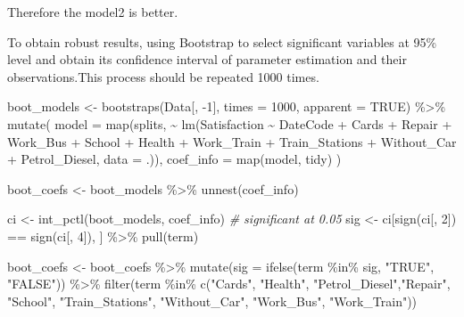 \documentclass[
]{article}
\newenvironment{Shaded}{\begin{snugshade}}{\end{snugshade}}
\newcommand{\AttributeTok}[1]{\textcolor[rgb]{0.77,0.63,0.00}{#1}}
\newcommand{\CommentTok}[1]{\textcolor[rgb]{0.56,0.35,0.01}{\textit{#1}}}
\newcommand{\ConstantTok}[1]{\textcolor[rgb]{0.00,0.00,0.00}{#1}}
\newcommand{\DecValTok}[1]{\textcolor[rgb]{0.00,0.00,0.81}{#1}}
\newcommand{\FunctionTok}[1]{\textcolor[rgb]{0.00,0.00,0.00}{#1}}
\newcommand{\NormalTok}[1]{#1}
\newcommand{\OtherTok}[1]{\textcolor[rgb]{0.56,0.35,0.01}{#1}}
\newcommand{\SpecialCharTok}[1]{\textcolor[rgb]{0.00,0.00,0.00}{#1}}
\newcommand{\StringTok}[1]{\textcolor[rgb]{0.31,0.60,0.02}{#1}}
\begin{document}
Therefore the model2 is better.

To obtain robust results, using Bootstrap to select significant
variables at 95\% level and obtain its confidence interval of parameter
estimation and their observations.This process should be repeated 1000
times.

\begin{Shaded}
\begin{Highlighting}[]
\NormalTok{boot\_models }\OtherTok{\textless{}{-}} \FunctionTok{bootstraps}\NormalTok{(Data[, }\SpecialCharTok{{-}}\DecValTok{1}\NormalTok{], }\AttributeTok{times =} \DecValTok{1000}\NormalTok{, }\AttributeTok{apparent =} \ConstantTok{TRUE}\NormalTok{) }\SpecialCharTok{\%\textgreater{}\%}
  \FunctionTok{mutate}\NormalTok{(}
    \AttributeTok{model =} \FunctionTok{map}\NormalTok{(splits, }\SpecialCharTok{\textasciitilde{}} \FunctionTok{lm}\NormalTok{(Satisfaction }\SpecialCharTok{\textasciitilde{}}\NormalTok{ DateCode }\SpecialCharTok{+}\NormalTok{ Cards }\SpecialCharTok{+}\NormalTok{ Repair }\SpecialCharTok{+}\NormalTok{ Work\_Bus }\SpecialCharTok{+} 
\NormalTok{                               School }\SpecialCharTok{+}\NormalTok{ Health }\SpecialCharTok{+}\NormalTok{ Work\_Train }\SpecialCharTok{+}\NormalTok{ Train\_Stations }\SpecialCharTok{+}\NormalTok{ Without\_Car }\SpecialCharTok{+} 
\NormalTok{                               Petrol\_Diesel, }\AttributeTok{data =}\NormalTok{ .)),}
    \AttributeTok{coef\_info =} \FunctionTok{map}\NormalTok{(model, tidy)}
\NormalTok{  )}

\NormalTok{boot\_coefs }\OtherTok{\textless{}{-}}\NormalTok{ boot\_models }\SpecialCharTok{\%\textgreater{}\%}
  \FunctionTok{unnest}\NormalTok{(coef\_info)}

\NormalTok{ci }\OtherTok{\textless{}{-}} \FunctionTok{int\_pctl}\NormalTok{(boot\_models, coef\_info)}
\CommentTok{\# significant at 0.05}
\NormalTok{sig }\OtherTok{\textless{}{-}}\NormalTok{ ci[}\FunctionTok{sign}\NormalTok{(ci[, }\DecValTok{2}\NormalTok{]) }\SpecialCharTok{==} \FunctionTok{sign}\NormalTok{(ci[, }\DecValTok{4}\NormalTok{]), ] }\SpecialCharTok{\%\textgreater{}\%} \FunctionTok{pull}\NormalTok{(term)}

\NormalTok{boot\_coefs }\OtherTok{\textless{}{-}}\NormalTok{  boot\_coefs }\SpecialCharTok{\%\textgreater{}\%}
  \FunctionTok{mutate}\NormalTok{(}\AttributeTok{sig =} \FunctionTok{ifelse}\NormalTok{(term }\SpecialCharTok{\%in\%}\NormalTok{ sig, }\StringTok{"TRUE"}\NormalTok{, }\StringTok{"FALSE"}\NormalTok{)) }\SpecialCharTok{\%\textgreater{}\%}
  \FunctionTok{filter}\NormalTok{(term }\SpecialCharTok{\%in\%} \FunctionTok{c}\NormalTok{(}\StringTok{"Cards"}\NormalTok{, }\StringTok{"Health"}\NormalTok{, }\StringTok{"Petrol\_Diesel"}\NormalTok{,}\StringTok{"Repair"}\NormalTok{, }\StringTok{"School"}\NormalTok{, }\StringTok{"Train\_Stations"}\NormalTok{, }\StringTok{"Without\_Car"}\NormalTok{, }\StringTok{"Work\_Bus"}\NormalTok{, }\StringTok{"Work\_Train"}\NormalTok{))}


\end{Highlighting}
\end{Shaded}
\end{document}
